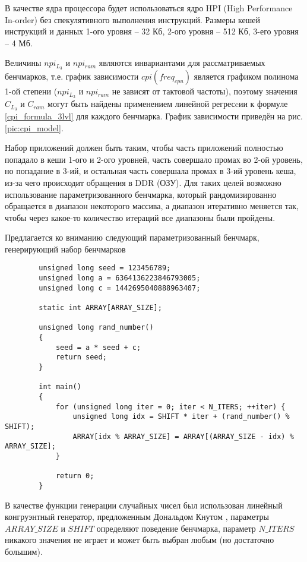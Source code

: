     В качестве ядра процессора будет использоваться ядро HPI (High Performance In-order)
    \cite{gem52017HPI} без спекулятивного выполнения инструкций. Размеры кешей инструкций и данных
    1-ого уровня -- 32 Кб, 2-ого уровня -- 512 Кб, 3-его уровня -- 4 Мб.

    Величины $npi_{L_3}$ и $npi_{ram}$ являются инвариантами для рассматриваемых бенчмарков, т.е.
    график зависимости $cpi(freq_{cpu})$ является графиком полинома 1-ой степени ($npi_{L_3}$ и
    $npi_{ram}$ не зависят от тактовой частоты), поэтому значения
    $C_{L_3}$ и $C_{ram}$ могут быть найдены
    применением линейной регресcии к формуле \eqref{cpi_formula_3lvl} для каждого бенчмарка.
    График зависимости приведён на рис. \ref{pic:cpi_model}.

    Набор приложений должен быть таким, чтобы часть приложений полностью попадало в кеши 1-ого и 2-ого уровней,
    часть совершало промах во 2-ой уровень, но попадание в 3-ий, и остальная часть совершала промах в 3-ий уровень
    кеша, из-за чего происходит обращения в DDR (ОЗУ). Для таких целей возможно использование параметризованного
    бенчмарка, который рандомизированно обращается в диапазон некоторого массива, а диапазон итеративно меняется так,
    чтобы через какое-то количество итераций все диапазоны были пройдены.

    Предлагается ко вниманию следующий параметризованный бенчмарк, генерирующий набор бенчмарков

    \begin{lstlisting}
        unsigned long seed = 123456789;
        unsigned long a = 6364136223846793005;
        unsigned long c = 1442695040888963407;

        static int ARRAY[ARRAY_SIZE];

        unsigned long rand_number()
        {
            seed = a * seed + c;
            return seed;
        }

        int main()
        {
            for (unsigned long iter = 0; iter < N_ITERS; ++iter) {
                unsigned long idx = SHIFT * iter + (rand_number() % SHIFT);
                ARRAY[idx % ARRAY_SIZE] = ARRAY[(ARRAY_SIZE - idx) % ARRAY_SIZE];
            }

            return 0;
        }
    \end{lstlisting}

    В качестве функции генерации случайных чисел был использован линейный конгруэнтный генератор,
    предложенным Дональдом Кнутом \cite{knuth1973art}, параметры $ARRAY\_SIZE$ и $SHIFT$ определяют
    поведение бенчмарка, параметр $N\_ITERS$ никакого значения не играет и может быть выбран любым
    (но достаточно большим).

